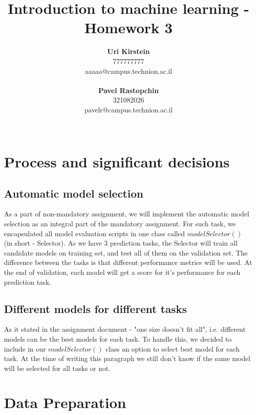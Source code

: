 \documentclass[12pt]{article}
\begin{document}
\title{\Large Introduction to machine learning - Homework 3}

\author{
  \textbf{Uri Kirstein}\\
  777777777 \\ aaaaa@campus.technion.ac.il
  \\ \\
  \textbf{Pavel Rastopchin}\\
  321082026 \\ pavelr@campus.technion.ac.il
  \\ \\ 
}

\maketitle


\newpage
\section{Process and significant decisions}
\subsection{Automatic model selection}
As a part of non-mandatory assignment, we will implement the automatic model selection as an integral part of the mandatory assignment. For such task, we encapsulated all model evaluation scripts in one class called $modelSelector()$ (in short - Selector). As we have 3 prediction tasks, the Selector will train all candidate models on training set, and test all of them on the validation set. The difference between the tasks is that different performance metrics will be used. At the end of validation, each model will get a score for it's performance for each prediction task.

\subsection{Different models for different tasks}
As it stated in the assignment document -  "one size doesn't fit all", i.e. different models can be the best models for each task. To handle this, we decided to include in our $modelSelector()$ class an option to select best model for each task. At the time of writing this paragraph we still don't know if the same model will be selected for all tasks or not.

\section{Data Preparation}
\end{document}
